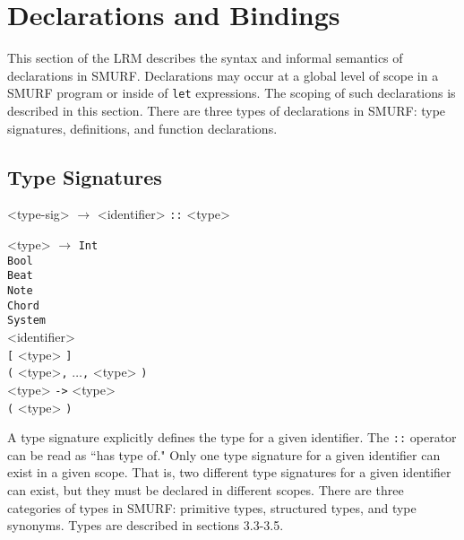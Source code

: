 \section{Declarations and Bindings}
\setlength{\grammarindent}{4em}

This section of the LRM describes the syntax and informal semantics of
declarations in SMURF. Declarations may occur at a global level of scope
in a SMURF program or inside of
\texttt{let} expressions. The scoping of such declarations is described 
in this section. There are three types of declarations in SMURF: 
type signatures, definitions, and function declarations.

\subsection{Type Signatures}

\begin{grammar}

<type-sig> $\rightarrow$ <identifier> \texttt{::} <type>

<type> $\rightarrow$ \texttt{Int} \\ \texttt{Bool} \\ \texttt{Beat} \\ \texttt{Note} \\
											\texttt{Chord} \\ \texttt{System} \\ <identifier> \\ 
											\texttt{[} <type> \texttt{]} \\ \texttt{(} <type>\texttt{,} 
											$\ldots$\texttt{,} <type> \texttt{)} \\ <type> \texttt{->} <type>
											 \\ \texttt{(} <type> \texttt{)}
										

\end{grammar}

A type signature explicitly defines the type for a given identifier. The
\texttt{::} operator can be read as ``has type of." Only one type signature
for a given identifier can exist in a given scope. That is, two different
type signatures for a given identifier can exist, but they must be declared
in different scopes. There are three categories of types in SMURF: primitive
types,  structured types, and type synonyms. Types are described in sections 3.3-3.5.

